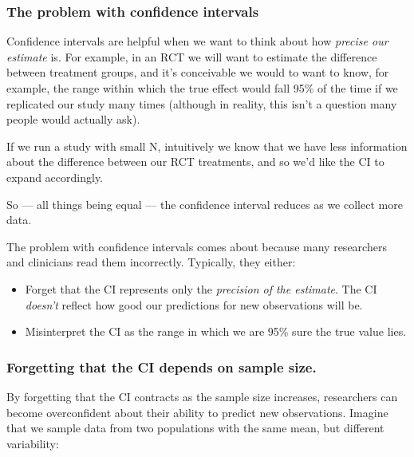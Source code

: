 \documentclass[]{article}
\theoremstyle{definition}
\theoremstyle{definition}
\theoremstyle{definition}
\theoremstyle{remark}
\begin{document}
\subsubsection*{The problem with confidence
intervals}\label{the-problem-with-confidence-intervals}

Confidence intervals are helpful when we want to think about how
\emph{precise our estimate} is. For example, in an RCT we will want to
estimate the difference between treatment groups, and it's conceivable
we would to want to know, for example, the range within which the true
effect would fall 95\% of the time if we replicated our study many times
(although in reality, this isn't a question many people would actually
ask).

If we run a study with small N, intuitively we know that we have less
information about the difference between our RCT treatments, and so we'd
like the CI to expand accordingly.

So --- all things being equal --- the confidence interval reduces as we
collect more data.

The problem with confidence intervals comes about because many
researchers and clinicians read them incorrectly. Typically, they
either:

\begin{itemize}
\item
  Forget that the CI represents only the \emph{precision of the
  estimate}. The CI \emph{doesn't} reflect how good our predictions for
  new observations will be.
\item
  Misinterpret the CI as the range in which we are 95\% sure the true
  value lies.
\end{itemize}

\subsubsection*{Forgetting that the CI depends on sample
size.}\label{forgetting-that-the-ci-depends-on-sample-size.}

By forgetting that the CI contracts as the sample size increases,
researchers can become overconfident about their ability to predict new
observations. Imagine that we sample data from two populations with the
same mean, but different variability:
\end{document}
